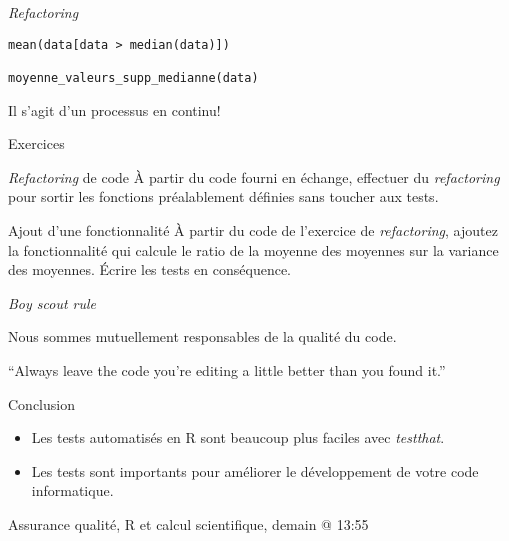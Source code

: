 \documentclass[11pt]{beamer}
\begin{document}
\begin{frame}[fragile]{\textit{Refactoring}}
\begin{block}{}
\begin{lstlisting}
mean(data[data > median(data)])

moyenne_valeurs_supp_medianne(data)
\end{lstlisting}
\end{block}

Il s'agit d'un processus en continu!
\end{frame}




\begin{frame}{Exercices}
\begin{block}{\textit{Refactoring} de code}
À partir du code fourni en échange, effectuer du \textit{refactoring} pour sortir les fonctions préalablement définies sans toucher aux tests.
\end{block}

\begin{block}{Ajout d'une fonctionnalité}
À partir du code de l'exercice de \textit{refactoring}, ajoutez la fonctionnalité qui calcule le ratio de la moyenne des moyennes sur la variance des moyennes. Écrire les tests en conséquence.
\end{block}
\end{frame}

\begin{frame}{\textit{Boy scout rule}}

Nous sommes mutuellement responsables de la qualité du code.

\begin{block}{}
{\large ``Always leave the code you're editing a little better than you found it.''}
\vskip5mm
\hspace*{}
\end{block}
\end{frame}


\begin{frame}{Conclusion}
\begin{itemize}
	\item Les tests automatisés en R sont beaucoup plus faciles avec \textit{testthat}.
	\item Les tests sont importants pour améliorer le développement de votre code informatique.
\end{itemize}

\begin{block}{}
\centering Assurance qualité, R et calcul scientifique, demain @ 13:55 
\end{block}
\end{frame}
\end{document}
